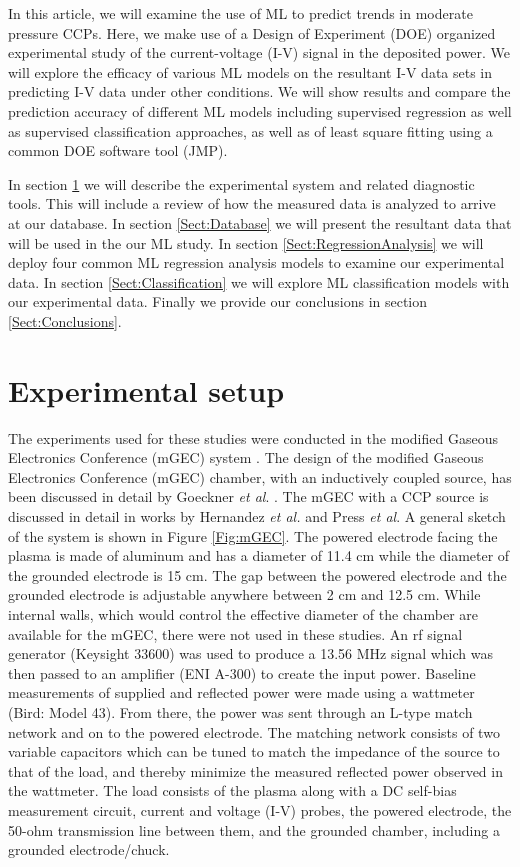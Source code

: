 \documentclass[12pt]{iopart}
\begin{document}
In this article, we will examine the use of ML to predict trends in moderate pressure CCPs.  Here, we make use of a  Design of Experiment (DOE)  organized experimental study of the current-voltage (I-V) signal in the deposited power. We will explore the efficacy of various ML models on the resultant I-V data sets in predicting I-V data under other conditions. We will show results and compare the prediction accuracy of different ML models including supervised regression as well as supervised classification approaches, as well as of least square fitting using a common DOE software tool (JMP).

In section \ref{Sect:ExpSetup} we will describe the experimental system and related diagnostic tools.  This will include a review of how the measured data is analyzed to arrive at our database.  In section \ref{Sect:Database} we will present the resultant data that will be used in the our ML study. In section 
\ref{Sect:RegressionAnalysis} we will deploy four common ML regression analysis models to examine our experimental data.  In section \ref{Sect:Classification} we will explore ML classification models with our experimental data. Finally we provide our conclusions in section \ref{Sect:Conclusions}.

\section{Experimental setup}\label{Sect:ExpSetup}
The experiments used for these studies were conducted in the modified Gaseous Electronics Conference (mGEC) system \cite{goeckner2004modified,hernandez2020electron,hernandez2021optical,press2019sub}. The design of the modified Gaseous Electronics Conference (mGEC) chamber, with an inductively coupled source, has been discussed in detail by Goeckner \textit{et al}. \cite{goeckner2004modified}. The mGEC with a CCP source is discussed in detail in works by Hernandez \textit{et al.} and Press \textit{et al}. \cite{hernandez2020electron,hernandez2021optical,press2019sub} A general sketch of the system is shown in Figure \ref{Fig:mGEC}. The powered electrode facing the plasma is made of aluminum and has a diameter of 11.4 cm while the diameter of the grounded electrode is 15 cm. The gap between the powered electrode and the grounded electrode is adjustable anywhere between 2 cm and 12.5 cm. While internal walls, which would control the effective diameter of the chamber are available for the mGEC, there were not used in these studies. An rf signal generator (Keysight 33600) was used to produce a 13.56 MHz signal which was then passed to an amplifier (ENI A-300) to create the input power.  Baseline measurements of supplied and reflected power were made using a wattmeter (Bird: Model 43).  From there, the power was sent through an L-type match network and on to the powered electrode. The matching network consists of two variable capacitors which can be tuned to match the impedance of the source to that of the load, and thereby minimize the measured reflected power observed in the wattmeter. The load consists of the plasma along with a DC self-bias measurement circuit, current and voltage (I-V) probes, the powered electrode, the 50-ohm transmission line between them, and the grounded chamber, including a grounded electrode/chuck.
\end{document}
